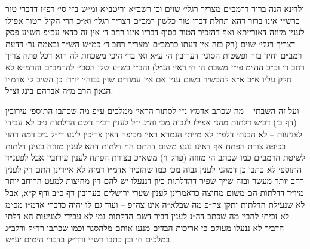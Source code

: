 \documentclass[12pt, openany]{book}
\begin{document}
\begin{multicols}{2}
ולדינא הנה ברור דרמב״ם מצריך רגלי׳ שוים וכן רשב״א וריטב״א ומ״ש ב״י סי׳ רפ״ז דדברי טור כרש״י אינו ברור דהא תחלת דברי טור כלשון רמב״ם דצריך רגלי׳ וא״כ הרי הקיל הטור אפילו לענין מזוזה דאורייתא ואף דהזכיר הטור בסוף דבריו אינו רחב ד׳ אין זה כדאי עכ״פ הש״ע פסק דצריך רגלי׳ שוים (רק בזה אין דעתו כרמב״ם ומצריך רחב ד׳ כמ״ש הש״ך ובאמת נר׳ דדעת רמב״ם יחיד בזה ופשטות הסוגי׳ דערובין ה׳ ע״א ואי בד׳ היכי משכחת לה הוא דכל פתח צריך רחב ד׳ וכ״כ הה״מ פי״ז משבת ה׳ ח׳ ראי׳ הנ״ל) והב״י בש״ע שלו הסכי׳ להרמב״ם והרמ״א לא חלק עליו א״כ א״א להכשיר בשום ענין אם אין עמודים שוין גבוהי׳ יו״ד: כן השיב לי אדמ״ו הגאון הרב מ״ה אברהם בינג זצ״ל.\\\vspace{0pt}

ועל זה השבתי – מה שכתב אדמ״ו נ״י לסתור הראי׳ ממלכים ע״פ מה שכתבו התוספ׳ עירובין (דף ב׳) דביש דלתות מהני אפילו לגבוה מכ׳ וה״נ י״ל לענין דביר דשם הדלתות ג״כ לא עבידי לצניעות – לא הבנתי דלפ״ז לא מייתי הגמרא ראי׳ מכיפה דאין צריכין ליגע די״ל ג״כ דמה דהוי בכיפה צורת הפתח אף דאינו נוגע משום דהתם הוי דלתות דהא לענין מזוזה בעינן דלתות לשיטת הרמב״ם כמו שכתב ה׳ מזוזה (פרק ו׳) משא״כ בצורת הפתח לענין עירובין אבל לפענ״ד התוספ׳ לא כתבו כן דמהני לענין גבוה מכ׳ כמו שהזכיר אדמ״ו דמזה לא איירינן התם רק לענין רחב יותר מעשר ובזה שייך שפיר דהדלתות כיון דננעלו יש להם דין מחיצות למעט הרוחב יותר מיו״ד דדלתות הם משום מחיצה כדאמרינן לענין שערי ירושלים בערובין דף כ״ב ודף ק״א, אבל לא שנעילת הדלתות יתקן צה״פ מה שבלא״ה אינו צה״פ – ועוד גם לו יהיה כדברי אדמ״ו מכ״מ לא זכיתי להבין מה שכתב דה״נ לענין דביר דשם הדלתות נמי לא עבידי לצניעות הא דלתי הדביר לא ננעלו מעולם כי אריכות הבדים מנעו אותם מלהסגר וכמו שכתבו רד״ק ורלב״ג במלכים ח׳ וכן כתבו רש״י ורד״ק בדברי הימים יע״ש.\\\vspace{0pt}


\end{multicols}
\end{document}
